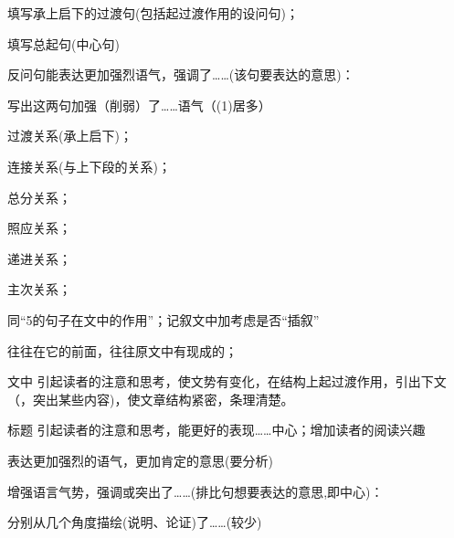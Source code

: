 \begin{asparaenum}[(1)]
\item 填写承上启下的过渡句(包括起过渡作用的设问句)；
 \item 填写总起句(中心句)
\end{asparaenum}

\begin{asparaenum}[(1)]
\item 反问句能表达更加强烈语气，强调了\ldots{}\ldots{}(该句要表达的意思)：
\item 写出这两句加强（削弱）了\ldots{}\ldots{}语气（(1)居多）
\end{asparaenum}

\begin{asparaenum}[(1)]
\item 过渡关系(承上启下)；
\item 连接关系(与上下段的关系)；
\item 总分关系；
\item 照应关系；
\item 递进关系；
\item 主次关系；
\end{asparaenum}

同``5的句子在文中的作用''；记叙文中加考虑是否``插叙''

往往在它的前面，往往原文中有现成的；

\begin{compactdesc}
\item[文中]引起读者的注意和思考，使文势有变化，在结构上起过渡作用，引出下文（，突出某些内容)，使文章结构紧密，条理清楚。
\item[标题]引起读者的注意和思考，能更好的表现\ldots{}\ldots{}中心；增加读者的阅读兴趣
\end{compactdesc}

表达更加强烈的语气，更加肯定的意思(要分析)\\

\begin{asparaenum}[(1)]
\item 增强语言气势，强调或突出了\ldots{}\ldots{}(排比句想要表达的意思,即中心)：
\item 分别从几个角度描绘(说明、论证)了\ldots{}\ldots{}(较少)
\end{asparaenum}

